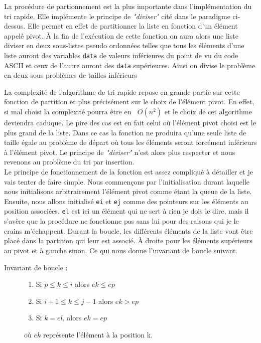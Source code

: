 \documentclass[a4paper, 12pt, leqno]{report}
\theoremstyle{plain}
\newcommand{\bigO}[1]{\ensuremath{\mathop{}\mathopen{}O\mathopen{}\left(#1\right)}}
\begin{document}
                La procédure de partionnement est la plus importante dans l'implémentation du tri rapide. Elle implémente le principe de \textit{"diviser"} cité dans le paradigme ci-dessus. Elle permet en effet de partitionner la liste en fonction d'un élément appelé pivot. À la fin de l'exécution de cette fonction on aura alors une liste diviser en deux sous-listes pseudo ordonnées telles que tous les éléments d'une liste auront des variables \verb+data+ de valeurs inférieures du point de vu du code ASCII et ceux de l'autre auront des \verb+data+ supérieures. Ainsi on divise le problème en deux sous problèmes de tailles inférieurs
                
                La complexité de l'algorithme de tri rapide repose en grande partie sur cette fonction de partition et plus précisément sur le choix de l'élément pivot. En effet, si mal choisi la complexité pourra être en $\bigO{n^2}$ et le choix de cet algorithme deviendra caduque. Le pire des cas est en fait celui où l'élément pivot choisi est le plus grand de la liste. Dans ce cas la fonction ne produira qu'une seule liste de taille égale au problème de départ où tous les éléments seront forcément inférieurs à l'élément pivot. Le principe de \textit{"diviser"} n'est alors plus respecter et nous revenons au problème du tri par insertion.\\
                
                Le principe de fonctionnement de la fonction est assez compliqué à détailler et je vais tenter de faire simple. Nous commençons par l'initialisation durant laquelle nous initialisons arbitrairement l'élément pivot comme étant la queue de la liste. Ensuite, nous allons initialisé \verb+ei+ et \verb+ej+ comme des pointeurs sur les éléments au position associées. \verb+el+ est ici un élément qui ne sert à rien je dois le dire, mais il s'avère que la procédure ne fonctionne pas sans lui pour des raisons qui je le crains m'échappent. Durant la boucle, les différents éléments de la liste vont être placé dans la partition qui leur est associé. À droite pour les éléments supérieurs au pivot et à gauche sinon. Ce qui nous donne l'invariant de boucle suivant.
            \begin{description}
            \item[Invariant de boucle :]  
                      
            \begin{enumerate}
            \item Si $p \leqslant k \leqslant i$ alors $ek \leqslant ep$
            \item Si $i+1 \leqslant k \leqslant j-1$ alors $ek > ep$
            \item Si $k=el$, alors $ek=ep$
            
            \end{enumerate}
            où $ek$ représente l'élément à la position k.
            \end{description}    
\end{document}

